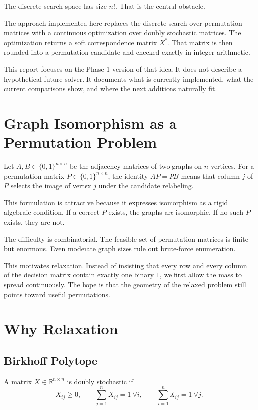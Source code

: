\documentclass[11pt]{article}
\begin{document}
The discrete search space has size $n!$.
That is the central obstacle.

The approach implemented here replaces the discrete search over permutation matrices with a continuous optimization over doubly stochastic matrices.
The optimization returns a soft correspondence matrix $X^*$.
That matrix is then rounded into a permutation candidate and checked exactly in integer arithmetic.

This report focuses on the Phase 1 version of that idea.
It does not describe a hypothetical future solver.
It documents what is currently implemented, what the current comparisons show, and where the next additions naturally fit.

\section{Graph Isomorphism as a Permutation Problem}

Let $A, B \in \{0,1\}^{n \times n}$ be the adjacency matrices of two graphs on $n$ vertices.
For a permutation matrix $P \in \{0,1\}^{n \times n}$,
the identity $AP = PB$ means that column $j$ of $P$ selects the image of vertex $j$ under the candidate relabeling.

This formulation is attractive because it expresses isomorphism as a rigid algebraic condition.
If a correct $P$ exists, the graphs are isomorphic.
If no such $P$ exists, they are not.

The difficulty is combinatorial.
The feasible set of permutation matrices is finite but enormous.
Even moderate graph sizes rule out brute-force enumeration.

This motivates relaxation.
Instead of insisting that every row and every column of the decision matrix contain exactly one binary $1$,
we first allow the mass to spread continuously.
The hope is that the geometry of the relaxed problem still points toward useful permutations.

\section{Why Relaxation}

\subsection{Birkhoff Polytope}

A matrix $X \in \mathbb{R}^{n \times n}$ is doubly stochastic if
\begin{equation}
X_{ij} \ge 0, \qquad \sum_{j=1}^{n} X_{ij} = 1 \ \forall i, \qquad \sum_{i=1}^{n} X_{ij} = 1 \ \forall j.
\end{equation}
\end{document}
